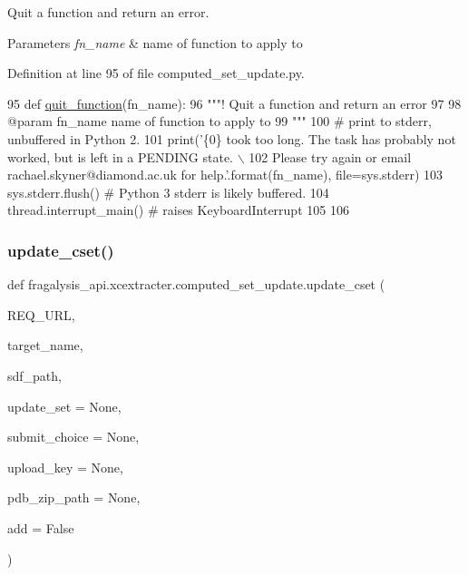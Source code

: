 Quit a function and return an error. 


\begin{DoxyParams}{Parameters}
{\em fn\+\_\+name} & name of function to apply to \\
\hline
\end{DoxyParams}


Definition at line 95 of file computed\+\_\+set\+\_\+update.\+py.


\begin{DoxyCode}
95 \textcolor{keyword}{def }\hyperlink{namespacefragalysis__api_1_1xcextracter_1_1computed__set__update_a9a7a1666e3c737a48bc3ebfe981adeef}{quit\_function}(fn\_name):
96     \textcolor{stringliteral}{"""! Quit a function and return an error}
97 \textcolor{stringliteral}{    }
98 \textcolor{stringliteral}{    @param fn\_name name of function to apply to}
99 \textcolor{stringliteral}{    """}
100     \textcolor{comment}{# print to stderr, unbuffered in Python 2.}
101     print(\textcolor{stringliteral}{'\{0\} took too long. The task has probably not worked, but is left in a PENDING state. \(\backslash\)}
102 \textcolor{stringliteral}{    Please try again or email rachael.skyner@diamond.ac.uk for help.'}.format(fn\_name), file=sys.stderr)
103     sys.stderr.flush() \textcolor{comment}{# Python 3 stderr is likely buffered.}
104     thread.interrupt\_main() \textcolor{comment}{# raises KeyboardInterrupt}
105     
106 
\end{DoxyCode}
\mbox{\label{namespacefragalysis__api_1_1xcextracter_1_1computed__set__update_a3fd757f4575c325be0c0288fa1f0738d}} 
\subsubsection{\texorpdfstring{update\+\_\+cset()}{update\_cset()}}
{\footnotesize\ttfamily def fragalysis\+\_\+api.\+xcextracter.\+computed\+\_\+set\+\_\+update.\+update\+\_\+cset (\begin{DoxyParamCaption}\item[{}]{R\+E\+Q\+\_\+\+U\+RL,  }\item[{}]{target\+\_\+name,  }\item[{}]{sdf\+\_\+path,  }\item[{}]{update\+\_\+set = {\ttfamily \textquotesingle{}None\textquotesingle{}},  }\item[{}]{submit\+\_\+choice = {\ttfamily None},  }\item[{}]{upload\+\_\+key = {\ttfamily None},  }\item[{}]{pdb\+\_\+zip\+\_\+path = {\ttfamily None},  }\item[{}]{add = {\ttfamily False} }\end{DoxyParamCaption})}



